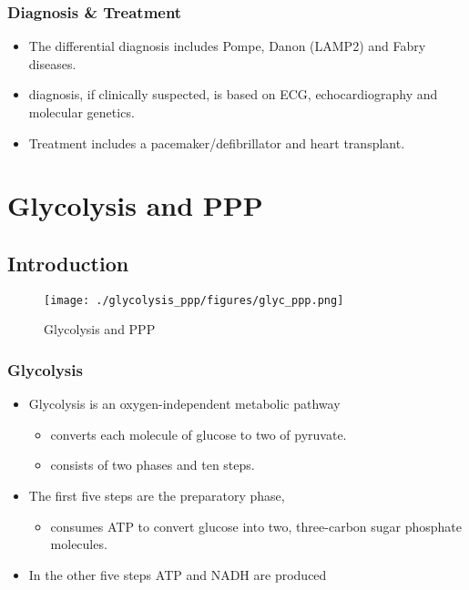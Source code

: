 \documentclass{scrartcl}
\begin{document}
\subsubsection{Diagnosis \& Treatment}
\label{sec:orgc5c70b6}
\begin{itemize}
\item The differential diagnosis includes Pompe, Danon (LAMP2) and Fabry diseases.

\item diagnosis, if clinically suspected, is based on ECG,
echocardiography and molecular genetics.

\item Treatment includes a pacemaker/defibrillator and heart transplant.
\end{itemize}

\section{Glycolysis and PPP}
\label{sec:org7b0ad6f}
\subsection{Introduction}
\label{sec:org27f570d}
\begin{figure}[htbp]
\centering
\texttt{[image: ./glycolysis\_ppp/figures/glyc\_ppp.png]}
\caption{\label{fig:orgfb45de9}
Glycolysis and PPP}
\end{figure}

\subsubsection{Glycolysis}
\label{sec:orga045e81}
\begin{itemize}
\item Glycolysis is an oxygen-independent metabolic pathway
\begin{itemize}
\item converts each molecule of glucose to two of pyruvate.
\item consists of two phases and ten steps.
\end{itemize}
\item The first five steps are the preparatory phase,
\begin{itemize}
\item consumes ATP to convert glucose into two, three-carbon sugar
phosphate molecules.
\end{itemize}
\item In the other five steps ATP and NADH are produced
\end{itemize}
\end{document}
